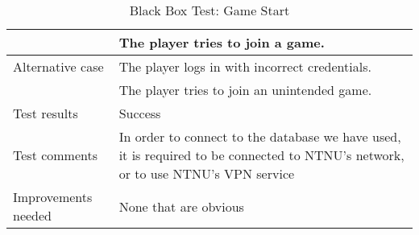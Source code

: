 {\begin{table}[H]
\begin{tabular}{| p{5cm} | p{10cm} |}
		& The player tries to join a game. \\ \hline
	Alternative case
		& The player logs in with incorrect credentials.\\
		& The player tries to join an unintended game. \\ \hline
	Test results 
		& Success \\ \hline
	Test comments
		& In order to connect to the database we have used, it is required to be connected to 
			NTNU's network, or to use NTNU's VPN service\\ \hline
	Improvements needed
		& None that are obvious \\ \hline
\end{tabular}


\caption{Black Box Test: Game Start}
\label{fig:black_box_test_1}
\end{table}}


